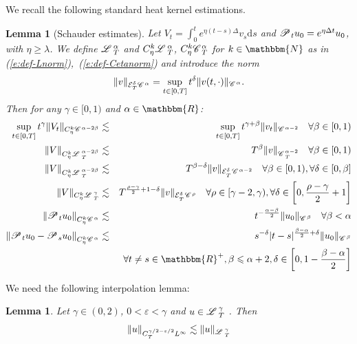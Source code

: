 \documentclass[11pt,reqno]{amsart}
\newcommand{\cdummy}{\cdot}
\newcommand{\mathd}{\mathrm{d}}
\newtheorem{lemma}[theorem]{Lemma}
\newcommand{\CC}{\mathscr{C} \hspace{.1em}}
\newcommand{\LL}{\mathscr{L} \hspace{.2em}}
\newcommand{\PP}{\mathscr{P} \hspace{.1em}}
\begin{document}
We recall the following standard heat kernel estimations.

\begin{lemma}[Schauder estimates]
  \label{l:schauder}Let $V_t = \int_0^t e^{\eta (t - s) \Delta} v_s \mathd s$
  and $\PP_t u_0 = e^{\eta \Delta t} u_0$, with $\eta \geqslant \lambda$. We
  define $\LL^{\alpha}_T$ and $C_{\eta}^k \LL^{\alpha}_T$, $C_{\eta}^k
  \CC^{\alpha}_T$ for $k \in \mathbbm{N}$ as in
  (\ref{e:def-Lnorm}),~(\ref{e:def-Cetanorm}) and introduce the norm
  \[ \| v \|_{\mathcal{E}^{\delta}_T \CC^{\alpha}} = \sup_{t \in [0, T]}
     t^{\delta} \| v (t, \cdummy) \|_{\CC^{\alpha}} . \]
  Then for any $\gamma \in [0, 1)$ and $\alpha \in \mathbbm{R}$:
  \begin{eqnarray*}
    \sup_{t \in [0, T]} t^{\gamma} \| V_t \|_{C_{\eta}^k \CC^{\alpha - 2
    \beta}} & \lesssim & \sup_{t \in [0, T]} t^{\gamma + \beta} \| v_t
    \|_{\CC^{\alpha - 2}} \quad \forall \beta \in [0, 1)\\
    \| V \|_{C_{\eta}^k \LL^{\alpha - 2 \beta}_T} & \lesssim & T^{\beta} \| v
    \|_{\CC^{\alpha - 2}_T} \quad \forall \beta \in [0, 1)\\
    \| V \|_{C_{\eta}^k \LL_T^{\alpha - 2 \beta}} & \lesssim & T^{\beta -
    \delta} \| v \|_{\mathcal{E}^{\delta}_{_T} \CC^{\alpha - 2}} \quad \forall
    \beta \in [0, 1), \forall \delta \in [0, \beta]\\
    \| V \|_{C_{\eta}^k \LL_T^{\gamma}} & \lesssim & T^{\frac{\rho -
    \gamma}{2} + 1 - \delta} \| v \|_{\mathcal{E}^{\delta}_{_T} \CC^{\rho}}
    \quad \forall \rho \in [\gamma - 2, \gamma), \forall \delta \in \left[ 0,
    \frac{\rho - \gamma}{2} + 1 \right]\\
    \left\| \PP_t u_0 \right\|_{C_{\eta}^k \CC^{\alpha}} & \lesssim & t^{-
    \frac{\alpha - \beta}{2}} \| u_0 \|_{\CC^{\beta}} \quad \forall \beta <
    \alpha\\
    \left\| \PP_t u_0 - \PP_s u_0 \right\|_{C_{\eta}^k \CC^{\alpha}} &
    \lesssim & s^{- \delta} | t - s |^{\frac{\beta - \alpha}{2} + \delta} \|
    u_0 \|_{\CC^{\beta}_{}}\\
    &  & \forall t \neq s \in \mathbbm{R}^+, \beta \leqslant \alpha + 2,
    \delta \in \left[ 0, 1 - \frac{\beta - \alpha}{2} \right]
  \end{eqnarray*}
\end{lemma}

We need the following interpolation lemma:

\begin{lemma}
  \label{l:interpol} Let $\gamma \in (0, 2)$, $0 < \varepsilon < \gamma$ and
  $u \in \LL^{\gamma}_T$ . Then
  \[ \| u \|_{C_T^{\gamma / 2 - \varepsilon / 2} L^{\infty}} \lesssim \| u
     \|_{\LL^{\gamma}_T} \]
\end{lemma}
\end{document}
